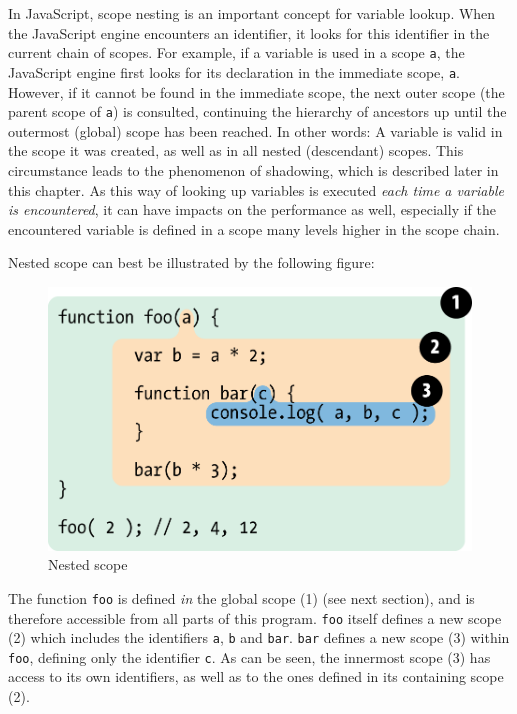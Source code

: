 In JavaScript, scope nesting is an important concept for variable
lookup. When the JavaScript engine encounters an identifier, it looks
for this identifier in the current chain of scopes. For example, if a
variable is used in a scope \texttt{a}, the JavaScript engine first
looks for its declaration in the immediate scope, \texttt{a}. However,
if it cannot be found in the immediate scope, the next outer scope (the
parent scope of \texttt{a}) is consulted, continuing the hierarchy of
ancestors up until the outermost (global) scope has been reached. In
other words: A variable is valid in the scope it was created, as well as
in all nested (descendant) scopes. This circumstance leads to the
phenomenon of shadowing, which is described later in this chapter. As
this way of looking up variables is executed \emph{each time a variable
is encountered}, it can have impacts on the performance as well,
especially if the encountered variable is defined in a scope many levels
higher in the scope chain.

Nested scope can best be illustrated by the following figure:

\begin{figure}[htbp]
\centering
\includegraphics{fig2.png}
\caption{Nested scope \cite{getify}}
\end{figure}

The function \texttt{foo} is defined \emph{in} the global scope (1) (see
next section), and is therefore accessible from all parts of this
program. \texttt{foo} itself defines a new scope (2) which includes the
identifiers \texttt{a}, \texttt{b} and \texttt{bar}. \texttt{bar}
defines a new scope (3) within \texttt{foo}, defining only the
identifier \texttt{c}. As can be seen, the innermost scope (3) has
access to its own identifiers, as well as to the ones defined in its
containing scope (2).

